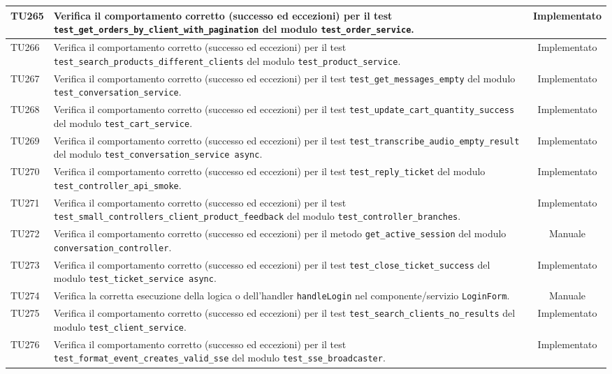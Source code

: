 \documentclass[a4paper,11pt,oneside]{scrartcl}
\begin{document}
\begin{longtable}{|p{1.9cm}|p{11.6cm}|c|}
    TU265 & Verifica il comportamento corretto (successo ed eccezioni) per il test \texttt{test\_get\_orders\_by\_client\_with\_pagination} del modulo \texttt{test\_order\_service}. & Implementato \\ \hline
    TU266 & Verifica il comportamento corretto (successo ed eccezioni) per il test \texttt{test\_search\_products\_different\_clients} del modulo \texttt{test\_product\_service}. & Implementato \\ \hline
    TU267 & Verifica il comportamento corretto (successo ed eccezioni) per il test \texttt{test\_get\_messages\_empty} del modulo \texttt{test\_conversation\_service}. & Implementato \\ \hline
    TU268 & Verifica il comportamento corretto (successo ed eccezioni) per il test \texttt{test\_update\_cart\_quantity\_success} del modulo \texttt{test\_cart\_service}. & Implementato \\ \hline
    TU269 & Verifica il comportamento corretto (successo ed eccezioni) per il test \texttt{test\_transcribe\_audio\_empty\_result} del modulo \texttt{test\_conversation\_service     async}. & Implementato \\ \hline
    TU270 & Verifica il comportamento corretto (successo ed eccezioni) per il test \texttt{test\_reply\_ticket} del modulo \texttt{test\_controller\_api\_smoke}. & Implementato \\ \hline
    TU271 & Verifica il comportamento corretto (successo ed eccezioni) per il test \texttt{test\_small\_controllers\_client\_product\_feedback} del modulo \texttt{test\_controller\_branches}. & Implementato \\ \hline
    TU272 & Verifica il comportamento corretto (successo ed eccezioni) per il metodo \texttt{get\_active\_session} del modulo \texttt{conversation\_controller}. & Manuale \\ \hline
    TU273 & Verifica il comportamento corretto (successo ed eccezioni) per il test \texttt{test\_close\_ticket\_success} del modulo \texttt{test\_ticket\_service     async}. & Implementato \\ \hline
    TU274 & Verifica la corretta esecuzione della logica o dell'handler \texttt{handleLogin} nel componente/servizio \texttt{LoginForm}. & Manuale \\ \hline
    TU275 & Verifica il comportamento corretto (successo ed eccezioni) per il test \texttt{test\_search\_clients\_no\_results} del modulo \texttt{test\_client\_service}. & Implementato \\ \hline
    TU276 & Verifica il comportamento corretto (successo ed eccezioni) per il test \texttt{test\_format\_event\_creates\_valid\_sse} del modulo \texttt{test\_sse\_broadcaster}. & Implementato \\ \hline

\end{longtable}
\end{document}
